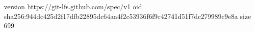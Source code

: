 version https://git-lfs.github.com/spec/v1
oid sha256:944dc425d2f17dfb22895dc64aa4f2c53936f6f9c42741d51f7dc279989c9e8a
size 699
